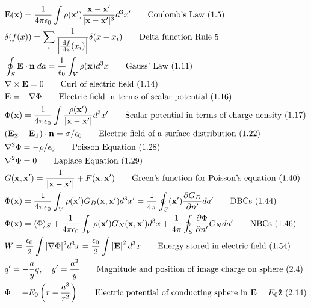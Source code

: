 \documentclass[10pt]{article}
\newcommand{\zhat}{\boldsymbol{\hat{\textbf{z}}}}
\newcommand{\vect}[1]{\boldsymbol{\mathbf{#1}}}
\newcommand{\vc}[1]{\mathbf{#1}}
\newcommand{\dd}{\, \mathrm{d}}
\newcommand{\eo}{\epsilon_0}
\newcommand{\tder}[2]{\frac{\dd #1}{\dd #2}}
\newcommand{\pder}[2]{\frac{\partial #1}{\partial #2}}
\newcommand{\K}{\frac{1}{4 \pi \eo}}
\begin{document}
\setlength{\abovedisplayskip}{-25pt}
\setlength{\belowdisplayskip}{0pt}
\setlength{\abovedisplayshortskip}{0pt}
\setlength{\belowdisplayshortskip}{0pt}
\begin{multicols}{2}
	\tiny
	\begin{align*}
		& \vect{E}(\vect{x}) = \frac{1}{4 \pi \eo} \int \rho(\vect{x}') \frac{\vect{x} - \vect{x}'}{|\vect{x} - \vect{x}'|^3} d^3x' \tag*{Coulomb's Law (1.5)} \\
		& \delta(f(x)) = \sum_{i} \frac{1}{\left|\tder{f}{x}(x_i)\right|}\delta(x - x_i)	\tag*{Delta function Rule 5 } \\
		& \oint_S \vc{E} \cdot \vc{n} \; da = \frac{1}{\eo} \int_V \rho(\vc{x}) d^3x	\tag*{Gauss' Law (1.11)} \\
		& \vc{\nabla} \times \vc{E} = 0	\tag*{Curl of electric field (1.14)} \\
		& \vc{E} = -\vc{\nabla} \Phi	\tag*{Electric field in terms of scalar potential (1.16)} \\
		& \Phi(\vc{x}) = \K \int \frac{\rho (\vc{x}')}{|\vc{x} - \vc{x}'|} d^3 x' \tag*{Scalar potential in terms of charge density (1.17)} \\
		& (\vc{E_2} - \vc{E_1}) \cdot \vc{n} = \sigma/\eo	\tag*{Electric field of a surface distribution (1.22)} \\
		& \nabla^2 \Phi = -\rho/\eo	\tag*{Poisson Equation (1.28)}\\
		& \nabla^2 \Phi = 0		\tag*{Laplace Equation (1.29)}\\
		& G(\vc{x}, \vc{x}') = \frac{1}{|\vc{x} - \vc{x}'|} + F(\vc{x}, \vc{x}')	\tag*{Green's function for Poisson's equation (1.40)} \\
		& \Phi(\vc{x}) = \K \int_V \rho(\vc{x}') G_D(\vc{x}, \vc{x}') d^3x' = \frac{1}{4 \pi} \oint_S(\vc{x}') \pder{G_D}{n'} da'	\tag*{DBCs (1.44)} \\
		& \Phi(\vc{x}) = \langle\Phi\rangle_S + \K \int_V \rho(\vc{x}') G_N(\vc{x},\vc{x}') d^3x + \frac{1}{4 \pi} \oint_S \pder{\Phi}{n'} G_N da'	\tag*{NBCs (1.46)} \\
		& W = \frac{\eo}{2} \int |\vc{\nabla} \Phi|^2 d^3x = \frac{\eo}{2} \int \left| \vc{E} \right|^2 d^3 x	\tag*{Energy stored in electric field (1.54)} \\
		& q' = -\frac{a}{y} q, \quad y' = \frac{a^2}{y}		\tag*{Magnitude and position of image charge on sphere (2.4)} \\
		& \Phi = -E_0 \left( r - \frac{a^3}{r^2} \right)	\tag*{Electric potential of conducting sphere in $\vect{E} = E_0 \zhat$ (2.14)} \\

\end{align*}
\end{multicols}
\end{document}
